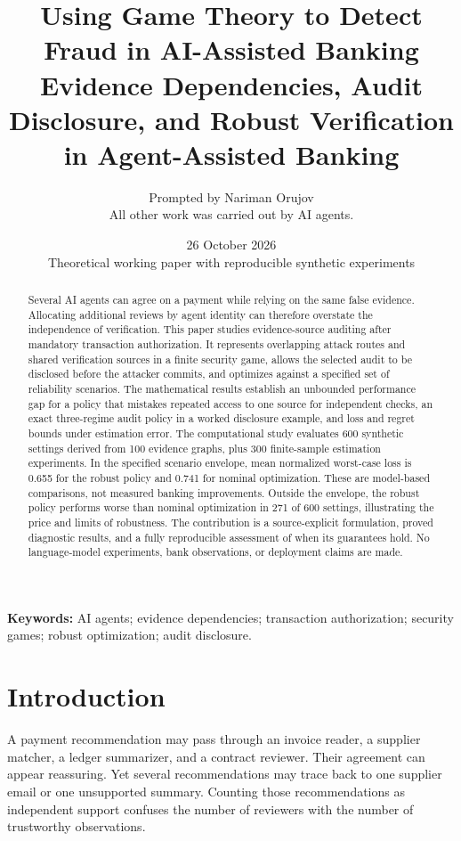 \documentclass[11pt,letterpaper]{article}
\title{Using Game Theory to Detect Fraud in AI-Assisted Banking\\[0.4em]\large Evidence Dependencies, Audit Disclosure, and Robust Verification in Agent-Assisted Banking}
\author{Prompted by Nariman Orujov\\[0.3em]\small All other work was carried out by AI agents.}
\date{26 October 2026\\\small Theoretical working paper with reproducible synthetic experiments}
\begin{document}
\maketitle

\begin{abstract}
Several AI agents can agree on a payment while relying on the same false evidence. Allocating additional reviews by agent identity can therefore overstate the independence of verification. This paper studies evidence-source auditing after mandatory transaction authorization. It represents overlapping attack routes and shared verification sources in a finite security game, allows the selected audit to be disclosed before the attacker commits, and optimizes against a specified set of reliability scenarios. The mathematical results establish an unbounded performance gap for a policy that mistakes repeated access to one source for independent checks, an exact three-regime audit policy in a worked disclosure example, and loss and regret bounds under estimation error. The computational study evaluates 600 synthetic settings derived from 100 evidence graphs, plus 300 finite-sample estimation experiments. In the specified scenario envelope, mean normalized worst-case loss is 0.655 for the robust policy and 0.741 for nominal optimization. These are model-based comparisons, not measured banking improvements. Outside the envelope, the robust policy performs worse than nominal optimization in 271 of 600 settings, illustrating the price and limits of robustness. The contribution is a source-explicit formulation, proved diagnostic results, and a fully reproducible assessment of when its guarantees hold. No language-model experiments, bank observations, or deployment claims are made.
\end{abstract}

\noindent\textbf{Keywords:} AI agents; evidence dependencies; transaction authorization; security games; robust optimization; audit disclosure.

\section{Introduction}

A payment recommendation may pass through an invoice reader, a supplier matcher, a ledger summarizer, and a contract reviewer. Their agreement can appear reassuring. Yet several recommendations may trace back to one supplier email or one unsupported summary. Counting those recommendations as independent support confuses the number of reviewers with the number of trustworthy observations.
\end{document}
